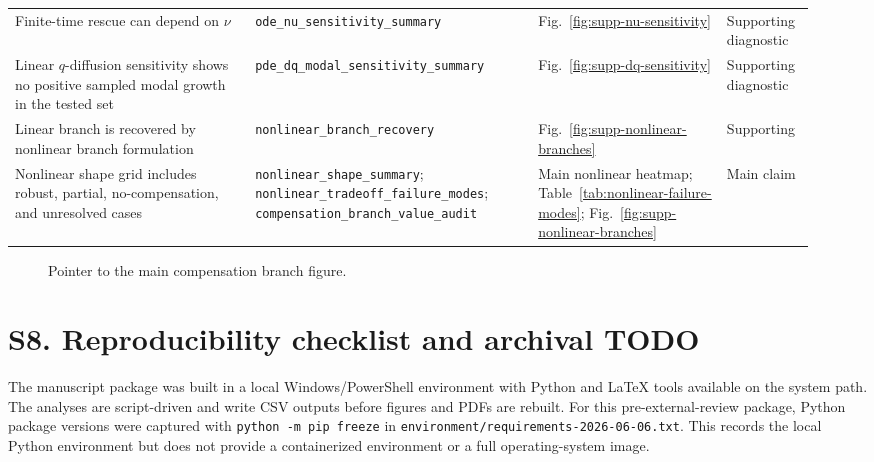 \documentclass[11pt]{article}
\begin{document}
\begin{landscape}
\begin{longtable}{L{0.28\linewidth}L{0.33\linewidth}L{0.22\linewidth}L{0.10\linewidth}}
  Finite-time rescue can depend on \(\nu\) & \texttt{ode\_nu\_sensitivity\_summary} & Fig.~\ref{fig:supp-nu-sensitivity} & Supporting diagnostic \\
  Linear \(q\)-diffusion sensitivity shows no positive sampled modal growth in the tested set & \texttt{pde\_dq\_modal\_sensitivity\_summary} & Fig.~\ref{fig:supp-dq-sensitivity} & Supporting diagnostic \\
  Linear branch is recovered by nonlinear branch formulation & \texttt{nonlinear\_branch\_recovery} & Fig.~\ref{fig:supp-nonlinear-branches} & Supporting \\
  Nonlinear shape grid includes robust, partial, no-compensation, and unresolved cases & \texttt{nonlinear\_shape\_summary}; \texttt{nonlinear\_tradeoff\_failure\_modes}; \texttt{compensation\_branch\_value\_audit} & Main nonlinear heatmap; Table~\ref{tab:nonlinear-failure-modes}; Fig.~\ref{fig:supp-nonlinear-branches} & Main claim \\
  \bottomrule
\end{longtable}
\normalsize

\end{landscape}

\begin{figure}[htbp]
  \centering
  \caption{Pointer to the main compensation branch figure.}
  \label{fig:supp-main-branch-note}
\end{figure}

\clearpage

\section*{S8. Reproducibility checklist and archival TODO}

The manuscript package was built in a local Windows/PowerShell environment with Python and \LaTeX{} tools available on the system path. The analyses are script-driven and write CSV outputs before figures and PDFs are rebuilt. For this pre-external-review package, Python package versions were captured with \texttt{python -m pip freeze} in \texttt{environment/requirements-2026-06-06.txt}. This records the local Python environment but does not provide a containerized environment or a full operating-system image.
\end{document}
